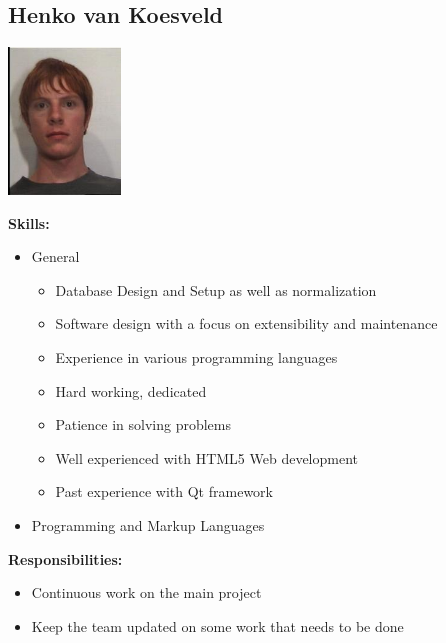 \documentclass[a4paper,12pt,final]{article}
\begin{document}
\newpage
\subsection{Henko van Koesveld}
\begin{center}
\includegraphics[width=3cm]{Henko.jpeg}
\end{center}
\textbf{Skills:}
\begin{itemize}
\item General
\begin{itemize}
	\item Database Design and Setup as well as normalization
	\item Software design with a focus on extensibility and maintenance
	\item Experience in various programming languages
	\item Hard working, dedicated
	\item Patience in solving problems
	\item Well experienced with HTML5 Web development
	\item Past experience with Qt framework
\end{itemize}
\item Programming and Markup Languages
\begin{itemize}
\end{itemize}
\end{itemize}
\textbf{Responsibilities:}
\begin{itemize}
\item Continuous work on the main project
\item Keep the team updated on some work that needs to be done
\end{itemize}
\end{document}
